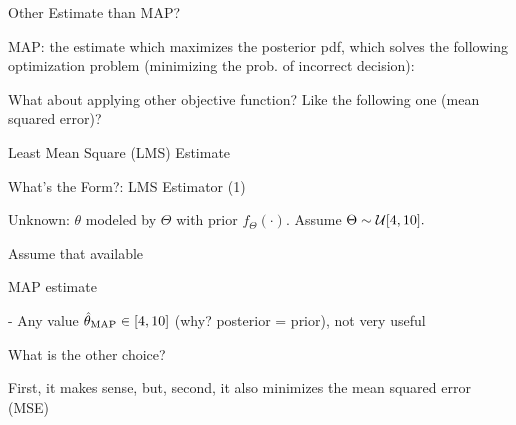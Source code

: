 \begin{frame}{Other Estimate than MAP?}
  
  \plitemsep 0.2in
  \bci
  
\item<2-> MAP: the estimate which maximizes the posterior pdf,
  which solves the following optimization problem (minimizing the prob. of incorrect decision):
  
\item<3->  What about applying other objective function? Like the
  following one (mean squared error)?


\bci
\item<5-> Least Mean Square (LMS) Estimate 
\eci
  \eci

\end{frame}




\begin{frame}{What's the Form?: LMS Estimator (1)}

\plitemsep 0.05in
\bci

\item<1-> Unknown: $\theta$ modeled by $\Theta$ with prior
  $f_{\Theta}(\cdot).$ Assume $\Theta \sim  \mathcal U[4,10].$

\item<2-> Assume that  available

\item<3-> MAP estimate

  - Any value $\hat{\theta}_{\text{MAP}} \in [4,10]$ (why? posterior = prior), not very useful

\item<4-> What is the other choice?


\item<6-> First, it makes sense, but, second, it also minimizes the mean squared error (MSE)
\small
{}


\eci

\end{frame}

